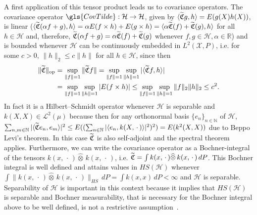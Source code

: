 \documentclass[AHL,Unicode,longabstracts,published]{cedram}
\theoremstyle{remark}
\DeclareMathOperator{\opp}{op}
\newcommand{\R}{\mathbb{R}}
\newcommand{\bbN}{\mathbb{N}}
\newcommand{\X}{\mathcal{X}}
\newcommand{\cH}{\mathcal{H}}
\newcommand{\clL}{\mathcal{L}}
\newcommand{\fkC}{\mathfrak{C}}
\newcommand{\Cov}{\tilde{\fkC}}
\let\oldtilde\tilde
\renewcommand*{\tilde}[1]{\mathchoice{\widetilde{#1}}{\widetilde{#1}}{\oldtilde{#1}}{\oldtilde{#1}}}
\renewcommand*{\to}{\mathchoice{\longrightarrow}{\rightarrow}{\rightarrow}{\rightarrow}}
\begin{document}
A first application of this tensor product leads us to covariance operators. The covariance operator $\gls{CovTilde} : \cH \to \cH$, given by $\langle \Cov g, h \rangle = E(g(X)h(X))$, is linear ($\langle \Cov(\alpha f+g), h \rangle = \alpha E(f \times h) + E(g \times h)=
\langle \alpha \Cov(f) + \Cov(g), h \rangle$ for all $h\in \cH$ and, therefore, $\Cov(\alpha f+g) = \alpha \Cov(f) + \Cov(g)$ whenever $f,g \in \cH, \alpha \in \R$) and is bounded whenever $\cH$ can be continuously embedded in $L^2(\X,P)$, i.e. for some $c>0$, $\|h\|_2 \leq c \|h\|$ for all $h\in\cH$, since then
\begin{align*}
\| \Cov \|_{\opp} &= \sup_{\|f\| = 1} \|\Cov f\| = \sup_{\|f\| = 1} \sup_{\|h\|=1} |\langle \Cov f,h \rangle| \\
&= \sup_{\|f\| = 1} \sup_{\|h\|=1} |E(f \times h)| \leq \sup_{\|f\| = 1} \sup_{\|h\|=1} \|f\|_2 \|h\|_2 \leq c^2.
\end{align*}
In fact it is a Hilbert--Schmidt operator whenever $\cH$ is separable and $k(X,X) \in \clL^2(\mu)$ because then for any orthonormal basis $\{e_n\}_{n\in \bbN}$ of $\cH$, $\sum_{n,m \in\bbN} |\langle \tilde{\fkC}e_n,e_m \rangle |^2
\leq E((\sum_{n\in\bbN} |\langle e_n, k(X,\,\cdot\,) \rangle|^2)^2) = E(k^2(X,X))$ due to Beppo Levi's theorem. In this case $\tilde{\fkC}$ is also self-adjoint and the spectral theorem applies. Furthermore, we can write the covariance operator as a Bochner-integral of the tensors $k(x,\,\cdot\,) \widehat \otimes \, k(x,\,\cdot\,)$, i.e. $\tilde{\fkC} = \int k(x,\,\cdot\,) \widehat \otimes \, k(x,\,\cdot\,) \, dP$. This Bochner integral is well defined and attains values in $HS(\cH)$ whenever $\int \|k(x,\,\cdot\,) \widehat \otimes \, k(x,\,\cdot\,) \|_{HS} \, dP = \int k(x,x) \, dP < \infty$ and $\cH$ is separable. Separability of $\cH$ is important in this context because it implies that $HS(\cH)$ is separable and Bochner measurability, that is necessary for the Bochner integral above to be well defined, is not a restrictive assumption~\cite[Appendix~B12]{DEF92}.
\end{document}
